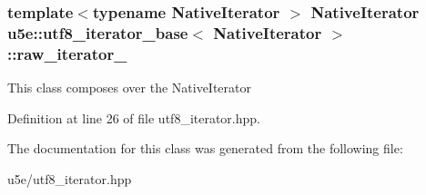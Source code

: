 \subsubsection[{\texorpdfstring{raw\+\_\+iterator\+\_\+}{raw_iterator_}}]{\setlength{\rightskip}{0pt plus 5cm}template$<$typename Native\+Iterator $>$ Native\+Iterator {\bf u5e\+::utf8\+\_\+iterator\+\_\+base}$<$ Native\+Iterator $>$\+::raw\+\_\+iterator\+\_\+}\hypertarget{classu5e_1_1utf8__iterator__base_a7b744615e45b142d6139a8920b70d2fc}{}\label{classu5e_1_1utf8__iterator__base_a7b744615e45b142d6139a8920b70d2fc}
This class composes over the Native\+Iterator 

Definition at line 26 of file utf8\+\_\+iterator.\+hpp.



The documentation for this class was generated from the following file\+:\begin{DoxyCompactItemize}
\item 
u5e/utf8\+\_\+iterator.\+hpp\end{DoxyCompactItemize}

